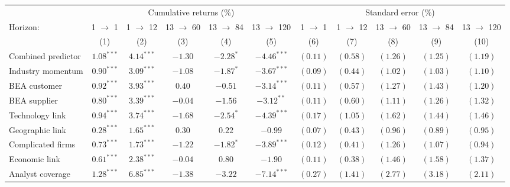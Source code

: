 \begin{tabular}{lcccccccccc}
   \toprule & \multicolumn{5}{c}{Cumulative returns (\%)} & \multicolumn{5}{c}{Standard error (\%)} \\
 \cmidrule(l){2-6} \cmidrule(l){7-11}Horizon: & 1 $\rightarrow$ 1 & 1 $\rightarrow$ 12 & 13 $\rightarrow$ 60 & 13 $\rightarrow$ 84 & 13 $\rightarrow$ 120 & 1 $\rightarrow$ 1 & 1 $\rightarrow$ 12 & 13 $\rightarrow$ 60 & 13 $\rightarrow$ 84 & 13 $\rightarrow$ 120 \\ 
   \cmidrule(l){2-6} \cmidrule(l){7-11} \vspace{5pt} & (1) & (2) & (3) & (4) & (5) & (6) & (7) & (8) & (9) & (10) \\ 
   \vspace{5pt}Combined predictor & $1.08^{***}$ & $4.14^{***}$ & $-1.30$ & $-2.28^{*}$ & $-4.46^{***}$ & $(0.11)$ & $(0.58)$ & $(1.26)$ & $(1.25)$ & $(1.19)$ \\ 
  Industry momentum & $0.90^{***}$ & $3.09^{***}$ & $-1.08$ & $-1.87^{*}$ & $-3.67^{***}$ & $(0.09)$ & $(0.44)$ & $(1.02)$ & $(1.03)$ & $(1.10)$ \\ 
  BEA customer & $0.92^{***}$ & $3.93^{***}$ & $0.40$ & $-0.51$ & $-3.14^{***}$ & $(0.11)$ & $(0.57)$ & $(1.27)$ & $(1.43)$ & $(1.20)$ \\ 
  BEA supplier & $0.80^{***}$ & $3.39^{***}$ & $-0.04$ & $-1.56$ & $-3.12^{**}$ & $(0.11)$ & $(0.60)$ & $(1.11)$ & $(1.26)$ & $(1.32)$ \\ 
  Technology link & $0.94^{***}$ & $3.74^{***}$ & $-1.68$ & $-2.54^{*}$ & $-4.39^{***}$ & $(0.17)$ & $(1.05)$ & $(1.62)$ & $(1.44)$ & $(1.46)$ \\ 
  Geographic link & $0.28^{***}$ & $1.65^{***}$ & $0.30$ & $0.22$ & $-0.99$ & $(0.07)$ & $(0.43)$ & $(0.96)$ & $(0.89)$ & $(0.95)$ \\ 
  Complicated firms & $0.73^{***}$ & $1.73^{***}$ & $-1.22$ & $-1.82^{*}$ & $-3.89^{***}$ & $(0.12)$ & $(0.41)$ & $(1.26)$ & $(1.07)$ & $(0.94)$ \\ 
  Economic link & $0.61^{***}$ & $2.38^{***}$ & $-0.04$ & $0.80$ & $-1.90$ & $(0.11)$ & $(0.38)$ & $(1.46)$ & $(1.58)$ & $(1.37)$ \\ 
  Analyst coverage & $1.28^{***}$ & $6.85^{***}$ & $-1.38$ & $-3.22$ & $-7.14^{***}$ & $(0.27)$ & $(1.41)$ & $(2.77)$ & $(3.18)$ & $(2.11)$ \\ 
   \bottomrule 
\end{tabular}
